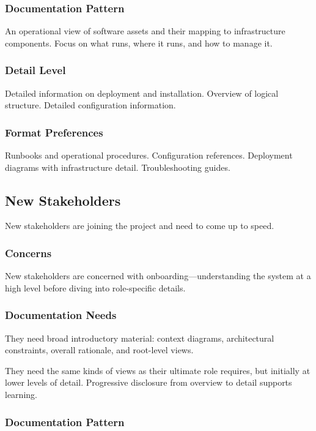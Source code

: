\documentclass[11pt]{article}
\begin{document}
\subsubsection{Documentation Pattern}

An operational view of software assets and their mapping to infrastructure components. Focus on what runs, where it runs, and how to manage it.

\subsubsection{Detail Level}

Detailed information on deployment and installation. Overview of logical structure. Detailed configuration information.

\subsubsection{Format Preferences}

Runbooks and operational procedures. Configuration references. Deployment diagrams with infrastructure detail. Troubleshooting guides.

\subsection{New Stakeholders}

New stakeholders are joining the project and need to come up to speed.

\subsubsection{Concerns}

New stakeholders are concerned with onboarding---understanding the system at a high level before diving into role-specific details.

\subsubsection{Documentation Needs}

They need broad introductory material: context diagrams, architectural constraints, overall rationale, and root-level views.

They need the same kinds of views as their ultimate role requires, but initially at lower levels of detail. Progressive disclosure from overview to detail supports learning.

\subsubsection{Documentation Pattern}
\end{document}
